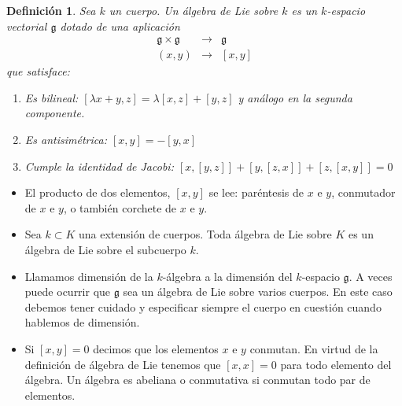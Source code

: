 \documentclass[a4paper,draft,12pt]{article}
\newtheorem{defi}{Definición}[section]%
\newcommand{\g}{\mathfrak{g}}%
\newcommand{\lto}{\longrightarrow}%
\newcommand{\df}[1]{\textsf{\color{blue}#1}}
\begin{document}
\begin{defi}

Sea  $k$  un cuerpo. Un  \df{álgebra de Lie}  sobre  $k$ es un  $k$-espacio vectorial $\g$ dotado de una aplicación
\[
\begin{array}{ccc}
 \g \times \g & \lto & \g \\
  (x,y)& \lto & [x,y]
\end{array}
\]
que satisface:

\begin{enumerate}[\indent 1.-]

 \item  Es bilineal: $[\lambda x+y,z]= \lambda[x,z]+[y,z]$ y análogo en la segunda componente.

\item  Es antisimétrica: $ [x, y ] = - [y,x ]$

\item   Cumple la   \df{identidad de Jacobi}:\label{identidad de Jacobi} $[x,[y,z ]  ] +[y,[z,x ]  ] + [z,[x,y ]  ]=0$ 

\end{enumerate}

\end{defi}




\begin{itemize}

\item El producto de dos elementos, $[x,y]$ se lee: paréntesis de  $x$ e $y$, conmutador de $x$ e $y$,  o también corchete de  $x$ e $y$.

\item Sea $k \subset K$ una extensión de cuerpos.  Toda álgebra de Lie sobre $K$ es un álgebra de Lie sobre el subcuerpo $k$. 

\item Llamamos   \df{dimensión}  de la  $k$-álgebra a la dimensión del  $k$-espacio $\g$.  A veces puede ocurrir que $\g$ sea un álgebra de Lie sobre varios cuerpos. En este caso debemos tener cuidado y especificar siempre el cuerpo en cuestión cuando hablemos de dimensión. 

\item Si $[x,y]=0$  decimos que los elementos  $x$  e  $y$  conmutan. En virtud de la definición de álgebra de Lie tenemos que $[x,x]=0$ para todo elemento del álgebra. Un álgebra es   \df{abeliana} o   \df{conmutativa}   si conmutan todo par de elementos.



\end{itemize}
\end{document}
